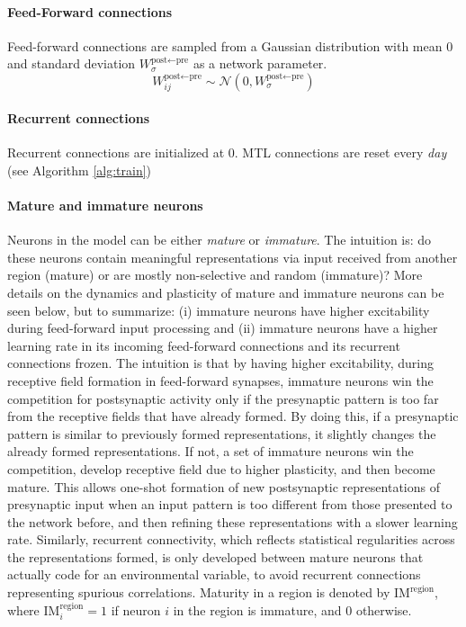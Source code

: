 \documentclass{article}
\begin{document}
\paragraph{Feed-Forward connections}
Feed-forward connections are sampled from a Gaussian distribution with mean 0 and standard deviation $W^{\textrm{post}\leftarrow\textrm{pre}}_\sigma$ as a network parameter.
\begin{equation}
    W^{\textrm{post}\leftarrow\textrm{pre}}_{ij} \sim \mathcal{N}(0, W^{\textrm{post}\leftarrow\textrm{pre}}_\sigma)
\end{equation}
\paragraph{Recurrent connections}
Recurrent connections are initialized at 0. MTL connections are reset every \textit{day} (see Algorithm \ref{alg:train})
\paragraph{Mature and immature neurons} Neurons in the model can be either \textit{mature} or \textit{immature}. The intuition is: do these neurons contain meaningful representations via input received from another region (mature) or are mostly non-selective and random (immature)? More details on the dynamics and plasticity of mature and immature neurons can be seen below, but to summarize: (i) immature neurons have higher excitability during feed-forward input processing and (ii) immature neurons have a higher learning rate in its incoming feed-forward connections and its recurrent connections frozen. The intuition is that by having higher excitability, during receptive field formation in feed-forward synapses, immature neurons win the competition for postsynaptic activity only if the presynaptic pattern is too far from the receptive fields that have already formed. By doing this, if a presynaptic pattern is similar to previously formed representations, it slightly changes the already formed representations. If not, a set of immature neurons win the competition, develop receptive field due to higher plasticity, and then become mature. This allows one-shot formation of new postsynaptic representations of presynaptic input when an input pattern is too different from those presented to the network before, and then refining these representations with a slower learning rate. Similarly, recurrent connectivity, which reflects statistical regularities across the representations formed, is only developed between mature neurons that actually code for an environmental variable, to avoid recurrent connections representing spurious correlations. Maturity in a region is denoted by $\textrm{IM}^\textrm{region}$, where $\textrm{IM}^\textrm{region}_i = 1$ if neuron $i$ in the region is immature, and 0 otherwise.
\end{document}
